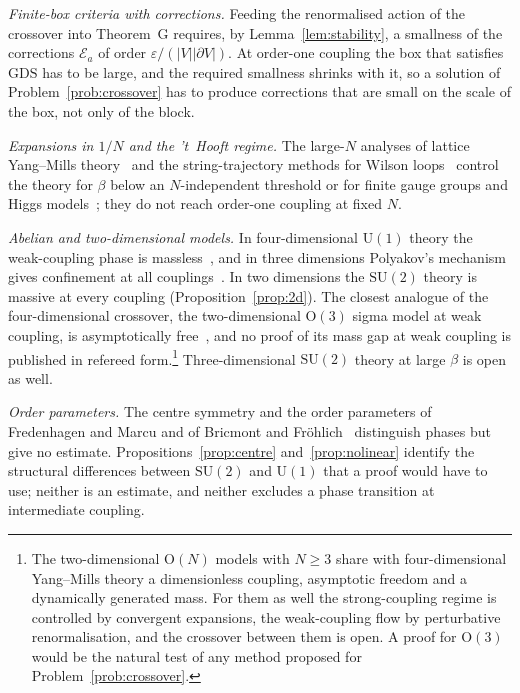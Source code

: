 \documentclass[aps,prd,twocolumn,superscriptaddress,nofootinbib,longbibliography,floatfix,amsmath,amssymb,10pt]{revtex4-2}
\theoremstyle{definition}
\theoremstyle{remark}
\newcommand{\SU}{\mathrm{SU}}
\newcommand{\U}{\mathrm{U}}
\begin{document}
\emph{Finite-box criteria with corrections.} Feeding the renormalised action
of the crossover into Theorem~G requires, by Lemma~\ref{lem:stability}, a
smallness of the corrections $\mathcal E_a$ of order $\varepsilon/(|V|
|\partial V|)$. At order-one coupling the box that satisfies
$\mathrm{GDS}$ has to be large, and the required smallness shrinks with it,
so a solution of Problem~\ref{prob:crossover} has to produce corrections
that are small on the scale of the box, not only of the block.

\emph{Expansions in $1/N$ and the 't~Hooft regime.} The large-$N$ analyses of
lattice Yang--Mills theory~\cite{GW80,BG18,Nis25} and the string-trajectory
methods for Wilson loops~\cite{Cha16,Cha19,CPS25,CNS25a,CNS25b,AC25} control
the theory for $\beta$ below an $N$-independent threshold or for finite
gauge groups and Higgs models~\cite{Cao20,Cha20,FLV23}; they do not reach
order-one coupling at fixed $N$.

\emph{Abelian and two-dimensional models.} In four-dimensional $\U(1)$ theory
the weak-coupling phase is massless~\cite{Gut80,FS82}, and in three
dimensions Polyakov's mechanism gives confinement at all
couplings~\cite{Pol75a,FS81,GS23}. In two dimensions the $\SU(2)$ theory is
massive at every coupling (Proposition~\ref{prop:2d}). The closest analogue
of the four-dimensional crossover, the two-dimensional $\mathrm O(3)$ sigma
model at weak coupling, is asymptotically free~\cite{Pol75b}, and no proof
of its mass gap at weak coupling is published in refereed form.\footnote{The two-dimensional
$\mathrm O(N)$ models with $N\ge3$ share with four-dimensional Yang--Mills
theory a dimensionless coupling, asymptotic freedom and a dynamically
generated mass. For them as well the strong-coupling regime is controlled by
convergent expansions, the weak-coupling flow by perturbative renormalisation,
and the crossover between them is open. A proof for $\mathrm O(3)$ would be
the natural test of any method proposed for Problem~\ref{prob:crossover}.}
Three-dimensional $\SU(2)$ theory at large $\beta$ is open as well.

\emph{Order parameters.} The centre symmetry and the order parameters of
Fredenhagen and Marcu and of Bricmont and Fr\"ohlich~\cite{tH78,BF83,FM86,MP79}
distinguish
phases but give no estimate. Propositions~\ref{prop:centre}
and~\ref{prop:nolinear} identify the structural differences between $\SU(2)$
and $\U(1)$ that a proof would have to use; neither is an estimate, and
neither excludes a phase transition at intermediate coupling.
\end{document}
